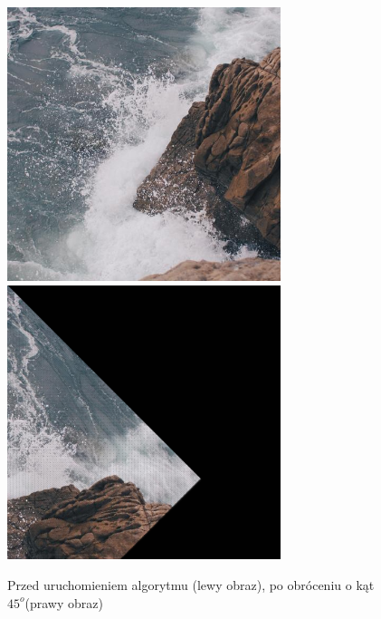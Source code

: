 \documentclass[a4paper,12pt]{book}
\begin{document}
\begin{figure}[H]
	\caption{Przed uruchomieniem algorytmu (lewy obraz), po obróceniu o kąt $45^o$(prawy obraz)}
	\includegraphics[width=8cm, height=8cm]{sea-unmodified.jpg}
	\includegraphics[width=8cm, height=8cm]{4-3/rotate-sea.png}
\end{figure}
\end{document}
